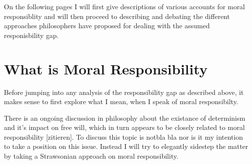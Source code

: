 \documentclass{article}
\begin{document}
On the following pages I will first give descriptions of various accounts for
moral responsiblity and will then proceed to describing and debating the
different approaches philosophers have proposed for dealing with the assumed
responisbility gap.

%
%
%
%
%

\section{What is Moral Responsibility}

Before jumping into any analysis of the responsibility gap as described above,
it makes sense to first explore what I mean, when I speak of moral
responsibilty.

There is an ongoing discussion in philosophy about the existance of determinism
and it's impact on free will, which in turn appears to be closely related to
moral responsibility [zitieren]. To discuss this topic is notbla bla nor is it
my intention to take a position on this issue. Instead I will try to elegantly
sidestep the matter by taking a Strawsonian approach on moral responsibility.
\end{document}
